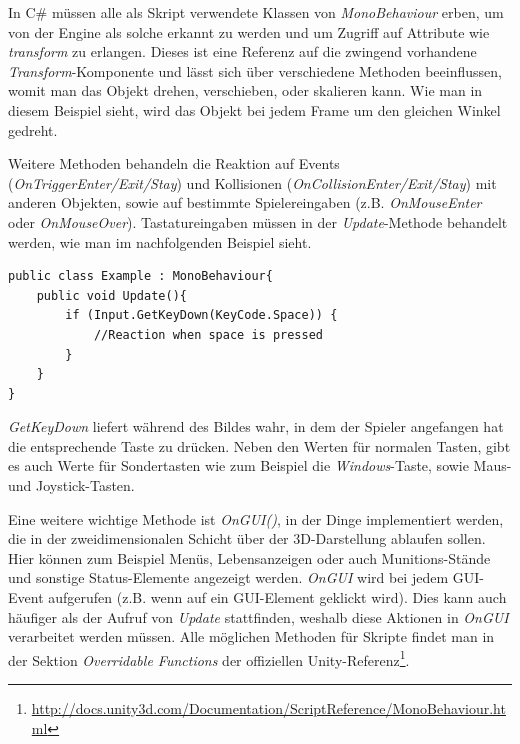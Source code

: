 In C\# müssen alle als Skript verwendete Klassen von \textit{MonoBehaviour} erben, um von der Engine als solche erkannt zu werden und um Zugriff auf Attribute wie \textit{transform} zu erlangen. Dieses ist eine Referenz auf die zwingend vorhandene \textit{Transform}-Komponente und lässt sich über verschiedene Methoden beeinflussen, womit man das Objekt drehen, verschieben, oder skalieren kann. Wie man in diesem Beispiel sieht, wird das Objekt bei jedem Frame um den gleichen Winkel gedreht.

Weitere Methoden behandeln die Reaktion auf Events (\textit{OnTriggerEnter/Exit/Stay}) und Kollisionen (\textit{OnCollisionEnter/Exit/Stay}) mit anderen Objekten, sowie auf bestimmte Spielereingaben (z.B. \textit{OnMouseEnter} oder \textit{OnMouseOver}). Tastatureingaben müssen in der \textit{Update}-Methode behandelt werden, wie man im nachfolgenden Beispiel sieht.\\

\begin{lstlisting}[caption={[Behandlung von Tastatureingaben]Behandlung von Tastatureingaben}]
public class Example : MonoBehaviour{
	public void Update(){
		if (Input.GetKeyDown(KeyCode.Space)) {
			//Reaction when space is pressed
		}
	}
}
\end{lstlisting}

\textit{GetKeyDown} liefert während des Bildes wahr, in dem der Spieler angefangen hat die entsprechende Taste zu drücken. Neben den Werten für normalen Tasten, gibt es auch Werte für Sondertasten wie zum Beispiel die \textit{Windows}-Taste, sowie Maus- und Joystick-Tasten.

Eine weitere wichtige Methode ist \textit{OnGUI()}, in der Dinge implementiert werden, die in der zweidimensionalen Schicht über der 3D-Darstellung ablaufen sollen. Hier können zum Beispiel Menüs, Lebensanzeigen oder auch Munitions-Stände und sonstige Status-Elemente angezeigt werden. \textit{OnGUI} wird bei jedem GUI-Event aufgerufen (z.B. wenn auf ein GUI-Element geklickt wird). Dies kann auch häufiger als der Aufruf von \textit{Update} stattfinden, weshalb diese Aktionen in \textit{OnGUI} verarbeitet werden müssen. Alle möglichen Methoden für Skripte findet man in der Sektion \textit{Overridable Functions} der offiziellen Unity-Referenz\footnote{\url{http://docs.unity3d.com/Documentation/ScriptReference/MonoBehaviour.html}}.
\pagebreak

